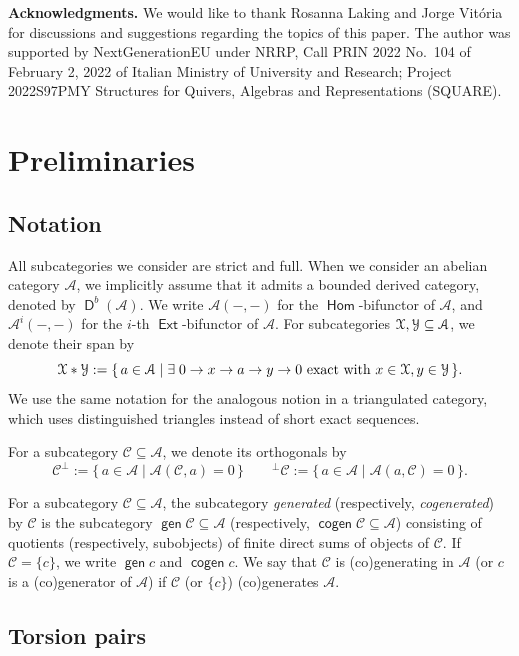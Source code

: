 \documentclass[a4paper,11pt]{amsart}
\theoremstyle{plain}
\theoremstyle{definition}
\newcommand{\Acal}{\mathcal{A}} \newcommand{\Bcal}{\mathcal{B}} \newcommand{\Ccal}{\mathcal{C}}
\newcommand{\Ycal}{\mathcal{Y}} \newcommand{\Zcal}{\mathcal{Z}}
\DeclareMathOperator{\Hom}{\mathsf{Hom}}
\DeclareMathOperator{\gen}{\mathsf{gen}}
\DeclareMathOperator{\cogen}{\mathsf{cogen}}
\DeclareMathOperator{\Ext}{\mathsf{Ext}}
\DeclareMathOperator{\D}{\mathsf{D}}
\begin{document}
\medskip

\textbf{Acknowledgments.} We would like to thank Rosanna Laking and Jorge
Vitória for discussions and suggestions regarding the topics of this paper. The
author was supported by NextGenerationEU under NRRP, Call PRIN 2022 No.\ 104 of
February 2, 2022 of Italian Ministry of University and Research; Project
2022S97PMY Structures for Quivers, Algebras and Representations (SQUARE).

\section{Preliminaries}\label{sec:preliminaries}

\subsection{Notation}

All subcategories we consider are strict and full. When we consider an abelian
category $\Acal$, we implicitly assume that it admits a bounded derived
category, denoted by $\D^b(\Acal)$. We write $\Acal(-,-)$ for the
$\Hom$-bifunctor of $\Acal$, and $\Acal^i(-,-)$ for the $i$-th
$\Ext$-bifunctor of $\Acal$. For subcategories $\Xcal,\Ycal\subseteq\Acal$, we
denote their span by
\[\Xcal\ast\Ycal:=\{\,a\in\Acal\mid \exists\;0\to x\to a\to y\to 0\text{ exact
with }x\in\Xcal, y\in\Ycal\,\}.\]
We use the same notation for the analogous notion in a triangulated category,
which uses distinguished triangles instead of short exact sequences.

For a subcategory $\Ccal\subseteq\Acal$, we denote its orthogonals by
\[\Ccal^\bot:=\{\,a\in\Acal\mid
\Acal(\Ccal,a)=0\,\}\qquad{}^\bot\Ccal:=\{\,a\in\Acal\mid\Acal(a,\Ccal)=0\,\}.\]

For a subcategory $\Ccal\subseteq\Acal$, the subcategory \emph{generated}
(respectively, \emph{cogenerated}) by $\Ccal$ is the subcategory
$\gen\Ccal\subseteq\Acal$ (respectively,
$\cogen\Ccal\subseteq\Acal$) consisting of quotients (respectively, subobjects)
of finite direct sums
of objects of $\Ccal$. If $\Ccal=\{c\}$, we write $\gen c$ and $\cogen c$. We
say that $\Ccal$ is (co)generating in $\Acal$ (or $c$ is a (co)generator of
$\Acal$) if $\Ccal$ (or $\{c\}$) (co)generates $\Acal$.

\subsection{Torsion pairs}
\end{document}
